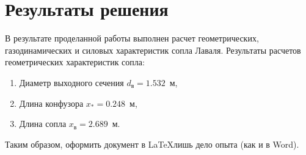 \documentclass[../homework.tex]{subfiles}
\begin{document}
\section{Результаты решения}

В результате проделанной работы выполнен расчет геометрических, газодинамических и силовых характеристик сопла Лаваля.
Результаты расчетов геометрических характеристик сопла:
\begin{enumerate}
\item Диаметр выходного сечения $d_{в} = 1.532$~м,
\item Длина конфузора $x_{*} = 0.248$~м,
\item Длина сопла $x_{в} = 2.689$~м.
\end{enumerate}

Таким образом, оформить документ в \LaTeX лишь дело опыта (как и в Word).
\end{document}
